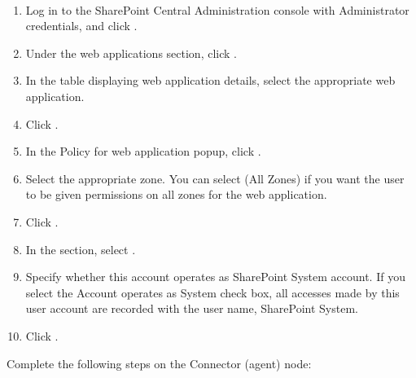 \documentclass[letterpaper,10pt,english]{sphinxmanual}
\begin{document}
\paragraph{}
\label{\detokenize{mcdmp_app_ug:step-3}}
\begin{enumerate}
\item {} 
Log in to the SharePoint Central Administration console with Administrator credentials, and click .

\item {} 
Under the web applications section, click .

\item {} 
In the table displaying web application details, select the appropriate web application.

\item {} 
Click .

\item {} 
In the Policy for web application popup, click .

\item {} 
Select the appropriate zone. You can select (All Zones) if you want the user to be given permissions on all zones for the web application.

\item {} 
Click .

\item {} 
In the  section, select .

\item {} 
Specify whether this account operates as SharePoint System account. If you select the Account operates as System check box, all accesses made by this user account are recorded with the user name, SharePoint System.

\item {} 
Click .

\end{enumerate}

Complete the following steps on the Connector (agent) node:
\end{document}
